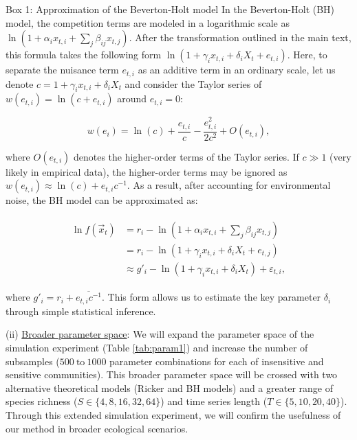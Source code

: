 \documentclass[12pt, class=article, crop=false]{standalone}
\begin{document}
\begin{tcolorbox}[{
  breakable,
  colback=white,
  colframe=gray,
  coltext=black,
  parbox=false,
  boxsep=5pt,
  arc=1pt}]
    Box 1: Approximation of the Beverton-Holt model
    \hline
    In the Beverton-Holt (BH) model, the competition terms are modeled in a logarithmic scale as $\ln(1 + \alpha_i x_{t,i} + \sum_j \beta_{ij} x_{t,j})$.
    After the transformation outlined in the main text, this formula takes the following form $\ln(1 + \gamma_i x_{t,i} + \delta_i X_t + e_{t,i})$.
    Here, to separate the nuisance term $e_{t,i}$ as an additive term in an ordinary scale, let us denote $c = 1 + \gamma_i x_{t,i} + \delta_i X_t$ and consider the Taylor series of $w(e_{t,i}) = \ln(c + e_{t,i})$ around $e_{t,i} = 0$:

    \begin{equation}
        \label{eq:bhtaylor}
        w(e_i) = \ln(c) + \frac{e_{t,i}}{c} - \frac{e_{t,i}^2}{2 c^2} + O(e_{t,i}),
    \end{equation}

    where $O(e_{t,i})$ denotes the higher-order terms of the Taylor series. If $c \gg 1$ (very likely in empirical data), the higher-order terms may be ignored as $w(e_{t,i}) \approx \ln(c) + e_{t,i} c^{-1}$.
    As a result, after accounting for environmental noise, the BH model can be approximated as:

    \begin{align}
    \begin{split}
        \ln f(\overset{\rightarrow}{x}_{t}) 
            &= r_i - \ln(1 + \alpha_i x_{t,i} + \sum_j \beta_{ij} x_{t,j})\\
            &= r_i - \ln(1 + \gamma_i x_{t,i} + \delta_{i} X_t + e_{t,j})\\
            &\approx g'_{i} - \ln(1 + \gamma_i x_{t,i} + \delta_i X_t) + \varepsilon_{t,i},
    \end{split}
    \end{align}

    where $g'_{i} = r_i + \overline{e_{t,i} c^{-1}}$. This form allows us to estimate the key parameter $\delta_i$ through simple statistical inference.
\end{tcolorbox}

(ii) \ul{Broader parameter space}: We will expand the parameter space of the simulation experiment (Table \ref{tab:param1}) and increase the number of subsamples ($500~\mbox{to}~1000$ parameter combinations for each of insensitive and sensitive communities).
This broader parameter space will be crossed with two alternative theoretical models (Ricker and BH models) and a greater range of species richness ($S \in \{4, 8, 16, 32, 64\}$) and time series length ($T \in \{5, 10, 20, 40\}$).
Through this extended simulation experiment, we will confirm the usefulness of our method in broader ecological scenarios.
\end{document}
